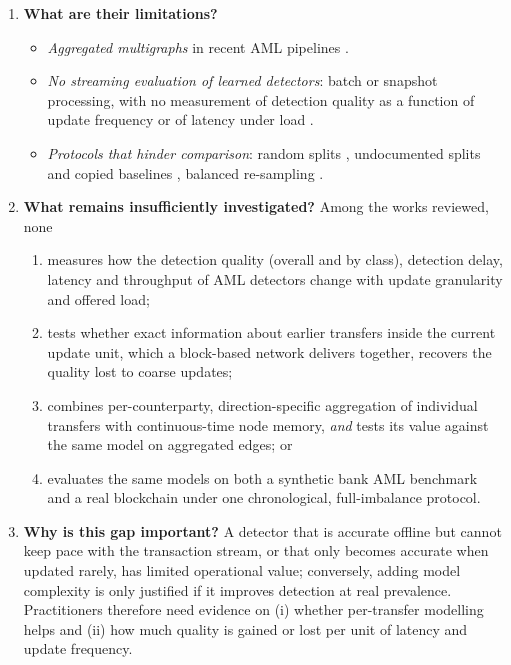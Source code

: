 \documentclass[11pt,a4paper]{article}
\begin{document}
\begin{enumerate}[leftmargin=*]
    \item \textbf{What are their limitations?}
    \begin{itemize}[leftmargin=*]
        \item \textit{Aggregated multigraphs} in recent AML pipelines \cite{tian2025kar,alemari2026explainable,rico2026taml,jia2025lmae4eth}.
        \item \textit{No streaming evaluation of learned detectors}: batch or snapshot processing, with no measurement of detection quality as a function of update frequency or of latency under load \cite{lin2026chronowave,jia2025lmae4eth,rico2026taml}.
        \item \textit{Protocols that hinder comparison}: random splits \cite{kasula2025ajk,jia2025lmae4eth,alemari2026explainable}, undocumented splits and copied baselines \cite{ferretti2025aml,li2025tfgat}, balanced re-sampling \cite{tian2025kar,rico2026taml}.
    \end{itemize}

    \item \textbf{What remains insufficiently investigated?}
    Among the works reviewed, none
    \begin{enumerate}[label=(\alph*)]
        \item measures how the detection quality (overall and by class), detection delay, latency and throughput of AML detectors change with update granularity and offered load;
        \item tests whether exact information about earlier transfers inside the current update unit, which a block-based network delivers together, recovers the quality lost to coarse updates;
        \item combines per-counterparty, direction-specific aggregation of individual transfers with continuous-time node memory, \emph{and} tests its value against the same model on aggregated edges; or
        \item evaluates the same models on both a synthetic bank AML benchmark and a real blockchain under one chronological, full-imbalance protocol.
    \end{enumerate}

    \item \textbf{Why is this gap important?}
    A detector that is accurate offline but cannot keep pace with the transaction stream, or that only becomes accurate when updated rarely, has limited operational value; conversely, adding model complexity is only justified if it improves detection at real prevalence. Practitioners therefore need evidence on (i) whether per-transfer modelling helps and (ii) how much quality is gained or lost per unit of latency and update frequency.


\end{enumerate}
\end{document}
